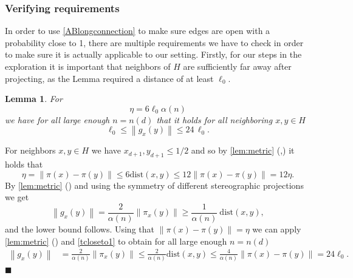 \documentclass[11pt]{article}%
\newenvironment{proof}{\vspace{1ex}\noindent{\bf Proof.}}{\hspace*{\fill}$\blacksquare$\vspace{1ex}}
\newtheorem{lemma}[lemma]{Lemma}
\newcommand{\norm}[1]{\ensuremath{\left\|#1\right\|}}
\newcommand{\dists}{{\mathrm{dist}}}
\newcommand*{\rom}[1]{\romannumeral #1\relax}
\begin{document}
\subsubsection{Verifying requirements}\label{sec:requirements}

In order to use \cref{ABlongconnection} to make sure edges are open with a probability close to 1, there are multiple requirements we have to check in order to make sure it is actually applicable to our setting. Firstly, for our steps in the exploration it is important that neighbors of $ H $ are sufficiently far away after projecting, as the Lemma required a distance of at least $\ell_0$. 
\begin{lemma}\label{mindistproj}
	For
	\begin{equation*}
		\eta=  6\ell_0\alpha(n)
	\end{equation*}
 we have for all large enough $ n=n(d)  $ that it holds for all neighboring $ x,y\in H $
	\begin{equation*}
		 \ell_0 \leq \norm{g_x(y)}\leq 24\,\ell_0 .
	\end{equation*}
\end{lemma}
\begin{proof}
   For neighbors $ x,y\in H $ we have $ x_{d+1},y_{d+1}\leq 1/2 $ and so by \cref{lem:metric} (\rom{1},\rom{3}) it holds that
   \begin{equation}\label{proofeq1}
   	 \eta=\norm{\pi(x)-\pi(y)}\leq 6\dists(x,y)\leq 12\norm{\pi(x)-\pi(y)}=12\eta. 
   \end{equation}
	By \cref{lem:metric} (\rom{1}) and using the symmetry of different stereographic projections we get
	\begin{equation*}
		\norm{g_x(y)}=\frac{2}{\alpha(n)}\norm{\pi_x(y)}\geq \frac{1}{\alpha(n)}\ \dists(x,y),  
	\end{equation*}
and the lower bound follows. Using that $ \norm{\pi(x)-\pi(y)}=\eta $ we can apply \cref{lem:metric} (\rom{2}) and \cref{tcloseto1} to obtain for all large enough $ n=n(d) $ 
\begin{equation*}
	\begin{split}
		\norm{g_x(y)}&=\frac{2}{\alpha(n)}\norm{\pi_x(y)}\leq\frac{2}{\alpha(n)} \dists(x,y)\leq  \frac{4}{\alpha(n)} \norm{\pi(x)-\pi(y)}=24\ell_0 .
	\end{split}
\end{equation*}
\end{proof}
\end{document}
